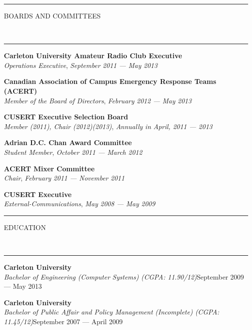 \documentclass[10pt, letterpaper, oneside]{article}
\newcommand{\HRule}[2]{\textcolor{#1}{\rule{\linewidth}{#2}}}
\newcommand{\sectiontitle}[1]{\begin{minipage}{\textwidth}\HRule{black}{0.25mm}\vspace{-10pt}\begin{center}\Large\MakeUppercase{#1}\end{center}\end{minipage}\\\HRule{light-grey}{0.15mm}\vspace{\baselineskip}}
\newenvironment{tightressection}[1]{
  \begin{minipage}{\textwidth}
  \sectiontitle{#1}}
  {\vspace{\baselineskip}\end{minipage}}
\newcommand{\boardentry}[3]{
  \begin{minipage}{\textwidth}
  \vspace{-9pt}
  \textbf{#1}\\
  \textit{#2}, \textit{#3}\\
  \vspace{0.5\baselineskip}
  \end{minipage}
}
\newcommand{\resedentry}[3]{
  \begin{minipage}{\textwidth}
  \vspace{-10pt}
  \textbf{#1}\\
  \textit{#2}\hfill\textcolor{light-grey}{#3}\\
  \vspace{0.5\baselineskip}
  \end{minipage}
}
\begin{document}
\begin{tightressection}{Boards and Committees}
  \boardentry{Carleton University Amateur Radio Club Executive}{Operations Executive}{September 2011 --- May 2013}
  \boardentry{Canadian Association of Campus Emergency Response Teams (ACERT)}{Member of the Board of Directors}{February 2012 --- May 2013}
  \boardentry{CUSERT Executive Selection Board}{Member (2011), Chair (2012)(2013)}{Annually in April, 2011 --- 2013}
  \boardentry{Adrian D.C. Chan Award Committee}{Student Member}{October 2011 --- March 2012}
  \boardentry{ACERT Mixer Committee}{Chair}{February 2011 --- November 2011}
  \boardentry{CUSERT Executive}{External-Communications}{May 2008 --- May 2009}
\end{tightressection}

\vspace{-15pt}
\begin{tightressection}{education}
  \resedentry{Carleton University}{Bachelor of Engineering (Computer Systems) (CGPA: 11.90/12)}{September 2009 --- May 2013}
  \resedentry{Carleton University}{Bachelor of Public Affair and Policy Management (Incomplete) (CGPA: 11.45/12)}{September 2007 --- April 2009}
\end{tightressection}
\end{document}

